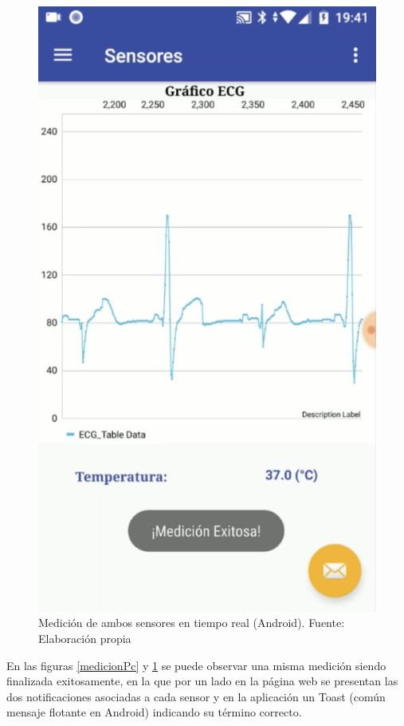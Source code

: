 \begin{figure}[H]
	\centering
	\includegraphics[scale=0.4]{figuras/protof/medicionApp.png}
	\caption{Medición de ambos sensores en tiempo real (Android). Fuente: Elaboración propia}
	\label{medicionApp}
\end{figure}

En las figuras \ref{medicionPc} y \ref{medicionApp} se puede observar una misma medición siendo finalizada exitosamente, en la que por un lado en la página web se presentan las dos notificaciones asociadas a cada sensor y en la aplicación un Toast (común mensaje flotante en Android) indicando su término correcto.

